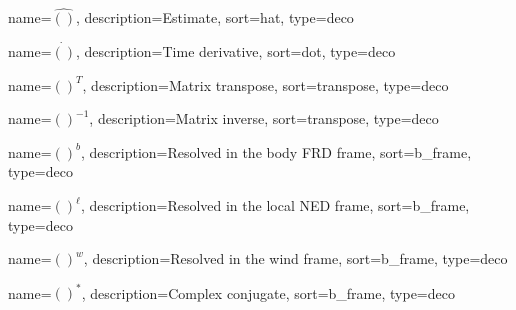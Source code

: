 {
	name={$\hat{()}$},
	description={Estimate},
	sort=hat,
	type=deco
}

{
	name={$\dot{()}$},
	description={Time derivative},
	sort=dot,
	type=deco
}

{
	name={$()^T$},
	description={Matrix transpose},
	sort=transpose,
	type=deco
}

{
	name={$()^{-1}$},
	description={Matrix inverse},
	sort=transpose,
	type=deco
}

{
	name={$()^b$},
	description={Resolved in the body FRD frame},
	sort=b_frame,
	type=deco
}

{
	name={$()^\ell$},
	description={Resolved in the local NED frame},
	sort=b_frame,
	type=deco
}

{
	name={$()^w$},
	description={Resolved in the wind frame},
	sort=b_frame,
	type=deco
}

{
	name={$()^*$},
	description={Complex conjugate},
	sort=b_frame,
	type=deco
}


